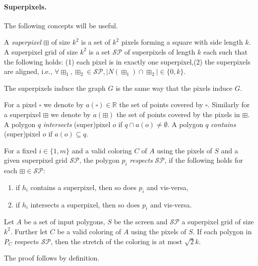 \documentclass[a4paper, UKenglish]{lipics-v2018}
\newcommand{\spg}{\mathcal{S\!P}}
\newcommand{\pix}{\square}
\newcommand{\spix}{\boxplus}
\begin{document}
\paragraph {Superpixels.}

The following concepts will be useful.

\begin{definition}
A \emph{superpixel} $\spix$ of size $k^2$ is a set of $k^2$ pixels forming a square with side length $k$.
A superpixel grid of size $k^2$ is a set $\spg$ of superpixels of length $k$ each such that the following holds:
(1) each pixel is in exactly one superpixel,(2) the superpixels are aligned, i.e., $\forall \spix_1, \spix_2\in \spg, |N(\spix_1)\cap \spix_2| \in \{0, k\}$.
\end{definition}

The superpixels induce the graph $G$ is the same way that the pixels induce $G$.

For a pixel $\pix$ we denote by $a(\pix)\in \mathbb{R}$ the set of points covered by $\pix$. Similarly for a superpixel $\spix$ we denote by $a(\spix)$ the set of points covered by the pixels in $\spix$. A polygon $q$ \emph{intersects} (super)pixel $o$ if $q\cap a(o)\neq \emptyset$. A polygon $q$ \emph{contains} (super)pixel $o$ if $a(o)\subseteq q$. 

\begin{definition}
For a fixed $i\in \{1, m\}$ and a valid coloring $C$ of $A$ using the pixels of $S$ and a given superpixel grid $\spg$, the polygon $p_i$ \emph{respects} $\spg$, if the following holds for each $\spix\in \spg$:
\begin{enumerate}
	\item if $h_i$ contains a superpixel, then so does $p_i$ and vis-versa,
	\item if $h_i$ intersects a superpixel, then so does $p_i$ and vis-versa.
\end{enumerate}
\end{definition}

\begin{lemma}\label{lem:respect_means_bound}
Let $A$ be a set of input polygons, $S$ be the screen and $\spg$ a superpixel grid of size $k^2$. Further let $C$ be a valid coloring of $A$ using the pixels of $S$.
If each polygon in $P_C$ respects $\spg$, then the stretch of the coloring is at most $\sqrt{2}k$.
\end{lemma}
The proof follows by definition.
\end{document}

